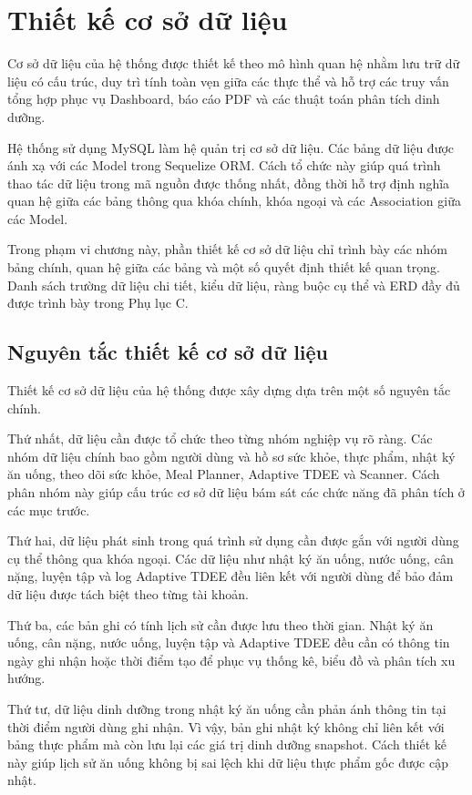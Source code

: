 \documentclass[12pt, a4paper]{report}
\begin{document}
\section{Thiết kế cơ sở dữ liệu}Cơ sở dữ liệu của hệ thống được thiết kế theo mô hình quan hệ nhằm lưu trữ dữ liệu có cấu trúc, duy trì tính toàn vẹn giữa các thực thể và hỗ trợ các truy vấn tổng hợp phục vụ Dashboard, báo cáo PDF và các thuật toán phân tích dinh dưỡng.

Hệ thống sử dụng MySQL làm hệ quản trị cơ sở dữ liệu. Các bảng dữ liệu được ánh xạ với các Model trong Sequelize ORM. Cách tổ chức này giúp quá trình thao tác dữ liệu trong mã nguồn được thống nhất, đồng thời hỗ trợ định nghĩa quan hệ giữa các bảng thông qua khóa chính, khóa ngoại và các Association giữa các Model.

Trong phạm vi chương này, phần thiết kế cơ sở dữ liệu chỉ trình bày các nhóm bảng chính, quan hệ giữa các bảng và một số quyết định thiết kế quan trọng. Danh sách trường dữ liệu chi tiết, kiểu dữ liệu, ràng buộc cụ thể và ERD đầy đủ được trình bày trong Phụ lục C.

\subsection{Nguyên tắc thiết kế cơ sở dữ liệu}Thiết kế cơ sở dữ liệu của hệ thống được xây dựng dựa trên một số nguyên tắc chính.

Thứ nhất, dữ liệu cần được tổ chức theo từng nhóm nghiệp vụ rõ ràng. Các nhóm dữ liệu chính bao gồm người dùng và hồ sơ sức khỏe, thực phẩm, nhật ký ăn uống, theo dõi sức khỏe, Meal Planner, Adaptive TDEE và Scanner. Cách phân nhóm này giúp cấu trúc cơ sở dữ liệu bám sát các chức năng đã phân tích ở các mục trước.

Thứ hai, dữ liệu phát sinh trong quá trình sử dụng cần được gắn với người dùng cụ thể thông qua khóa ngoại. Các dữ liệu như nhật ký ăn uống, nước uống, cân nặng, luyện tập và log Adaptive TDEE đều liên kết với người dùng để bảo đảm dữ liệu được tách biệt theo từng tài khoản.

Thứ ba, các bản ghi có tính lịch sử cần được lưu theo thời gian. Nhật ký ăn uống, cân nặng, nước uống, luyện tập và Adaptive TDEE đều cần có thông tin ngày ghi nhận hoặc thời điểm tạo để phục vụ thống kê, biểu đồ và phân tích xu hướng.

Thứ tư, dữ liệu dinh dưỡng trong nhật ký ăn uống cần phản ánh thông tin tại thời điểm người dùng ghi nhận. Vì vậy, bản ghi nhật ký không chỉ liên kết với bảng thực phẩm mà còn lưu lại các giá trị dinh dưỡng snapshot. Cách thiết kế này giúp lịch sử ăn uống không bị sai lệch khi dữ liệu thực phẩm gốc được cập nhật.
\end{document}
